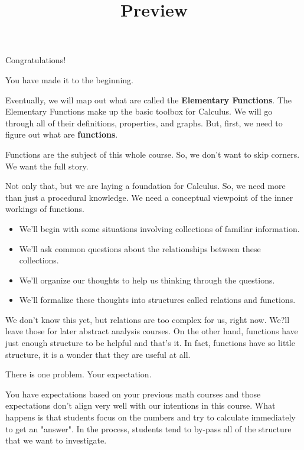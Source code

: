 \documentclass{ximera}
\title{Preview}
\begin{document}
\begin{abstract}
\end{abstract}

\maketitle



Congratulations!  

You have made it to the beginning. 


Eventually, we will map out what are called the \textbf{Elementary Functions}.  The Elementary Functions make up the basic toolbox for Calculus. We will go through all of their definitions, properties, and graphs. But, first, we need to figure out what are \textbf{functions}.

Functions are the subject of this whole course.  So, we don't want to skip corners.  We want the full story.  

Not only that, but we are laying a foundation for Calculus. So, we need more than just a procedural knowledge.  We need a conceptual viewpoint of the inner workings of functions.  

\begin{itemize}
\item We'll begin with some situations involving collections of familiar information.  
\item We'll ask common questions about the relationships between these collections.
\item We'll organize our thoughts to help us thinking through the questions.
\item We'll formalize these thoughts into structures called relations and functions.
\end{itemize}



We don't know this yet, but relations are too complex for us, right now. We?ll leave those for later abstract analysis courses. On the other hand, functions have just enough structure to be helpful and that's it.  In fact, functions have so little structure, it is a wonder that they are useful at all.

There is one problem.  Your expectation.

You have expectations based on your previous math courses and those expectations don't align very well with our intentions in this course.  What happens is that students focus on the numbers and try to calculate immediately to get an "answer".  In the process, students tend to by-pass all of the structure that we want to investigate. 
\end{document}
